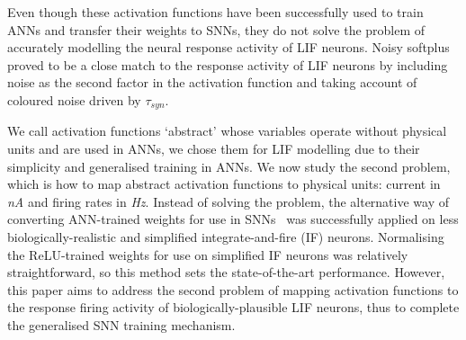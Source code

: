 \documentclass{article}
\begin{document}
Even though these activation functions have been successfully used to train ANNs and transfer their weights to SNNs, they do not solve the problem of accurately modelling the neural response activity of LIF neurons.%
Noisy softplus~\cite{liu2016noisy} proved to be a close match to the response activity of LIF neurons by including noise as the second factor in the activation function and taking account of coloured noise driven by $\tau_{syn}$.

We call activation functions `abstract' whose variables operate without physical units and are used in ANNs, we chose them for LIF modelling due to their simplicity and generalised training in ANNs. 
We now study the second problem, which is how to map abstract activation functions to physical units: current in \textit{nA} and firing rates in \textit{Hz}.
Instead of solving the problem, the alternative way of converting ANN-trained weights for use in SNNs~\cite{cao2015spiking,diehl2015fast} was successfully applied on less biologically-realistic and simplified integrate-and-fire (IF) neurons.
Normalising the ReLU-trained weights for use on simplified IF neurons was relatively straightforward, so this method sets the state-of-the-art performance.
However, this paper aims to address the second problem of mapping activation functions to the response firing activity of biologically-plausible LIF neurons, thus to complete the generalised SNN training mechanism.



\end{document}
